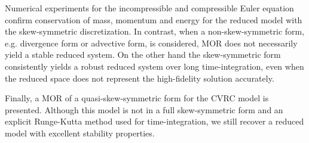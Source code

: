 Numerical experiments for the incompressible and compressible Euler equation confirm conservation of mass, momentum and energy for the reduced model with the skew-symmetric discretization. In contrast, when a non-skew-symmetric form, e.g. divergence form or advective form, is considered, MOR does not necessarily yield a stable reduced system. On the other hand the skew-symmetric form consistently yields a robust reduced system over long time-integration, even when the reduced space does not represent the high-fidelity solution accurately. 

Finally, a MOR of a quasi-skew-symmetric form for the CVRC model is presented. Although this model is not in a full skew-symmetric form and an explicit Runge-Kutta method used for time-integration, we still recover a reduced model with excellent stability properties.

